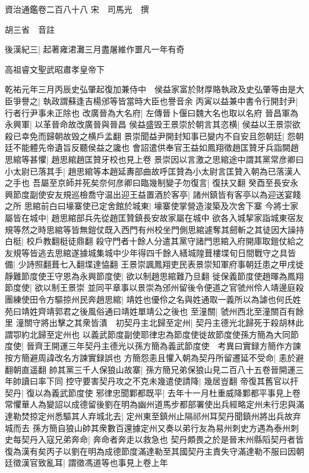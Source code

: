 資治通鑑卷二百八十八
宋　司馬光　撰

胡三省　音註

後漢紀三|{
	起著雍涒灘三月盡屠維作噩凡一年有奇}


高祖睿文聖武昭肅孝皇帝下

乾祐元年三月丙辰史弘肇起復加兼侍中　侯益家富於財厚賂執政及史弘肇等由是大臣爭譽之|{
	執政謂蘇逢吉楊邠等皆當時大臣也譽音余}
丙寅以益兼中書令行開封尹|{
	行者行尹事未正除也}
改廣晉為大名府|{
	左傳晉卜偃曰魏大名也取以名府}
晉昌軍為永興軍|{
	以革晉命故改廣晉與晉昌}
侯益盛毁王景崇於朝言其恣横|{
	侯益以王景崇欲殺已幸免而歸朝故毁之横戶孟翻}
景崇聞益尹開封知事已變内不自安且怨朝廷|{
	怨朝廷不能體先帝遺旨反聽侯益之讒也}
會詔遣供奉官王益如鳳翔徵趙匡贊牙兵詣闕趙思綰等甚懼|{
	趙思綰趙匡贊牙校也見上卷}
景崇因以言激之思綰途中謂其黨常彦卿曰小太尉已落其手|{
	趙思綰等本趙延夀部曲故呼匡贊為小太尉言匡贊入朝為已落漢人之手也}
吾屬至京師并死矣奈何彦卿曰臨幾制變子勿復言|{
	復扶又翻}
癸酉至長安永興節度副使安友規巡檢喬守温出迎王益置酒於客亭|{
	諸州鎮皆有客亭以為迎送宴餞之所}
思綰前白曰壕寨使已定舍館於城東|{
	壕寨使掌營造浚築及次舍下寨}
今將士家屬皆在城中|{
	趙思綰部兵先從趙匡贊鎮長安故家屬在城中}
欲各入城挈家詣城東宿友規等然之時思綰等皆無鎧仗既入西門有州校坐門側思綰遽奪其劒斬之其徒因大譟持白梃|{
	校戶教翻梃徒鼎翻}
殺守門者十餘人分遣其黨守諸門思綰入府開庫取鎧仗給之友規等皆逃去思綰遂據城集城中少年得四千餘人繕城隍葺樓堞旬日間戰守之具皆備|{
	少詩照翻葺七入翻堞達恊翻}
王景崇諷鳳翔吏民表景崇知軍府事朝廷患之甲戌徙靜難節度使王守恩為永興節度使|{
	欲以制趙思綰難乃旦翻}
徙保義節度使趙暉為鳳翔節度使|{
	欲以制王景崇}
並同平章事以景崇為邠州留後令便道之官虢州伶人靖邊庭殺團練使田令方驅掠州民奔趙思綰|{
	靖姓也優伶之名與姓通取一義所以為謔也何氏姓苑曰靖姓齊靖郭君之後風俗通曰靖姓單靖公之後也}
至潼關|{
	虢州西北至潼關百有餘里}
潼關守將出擊之其衆皆潰　初契丹主北歸至定州|{
	契丹主德光北歸死于殺胡林此謂卾約北歸至定州也}
以義武節度副使耶律忠為節度使徙故節度使孫方簡為大同節度使|{
	晉齊王開運三年契丹主德光以孫方簡為義武節度使　考異曰實録方簡作方諫按方簡避周諱改名方諫實録誤也}
方簡怨恚且懼入朝為契丹所留遷延不受命|{
	恚於避翻朝直遥翻}
帥其黨三千人保狼山故寨|{
	孫方簡兄弟保狼山見二百八十五卷晉開運三年帥讀曰率下同}
控守要害契丹攻之不克未幾遣使請降|{
	幾居豈翻}
帝復其舊官以扞契丹|{
	復以為義武節度使}
邪律忠聞鄴都既平|{
	去年十一月杜重威降鄴都平事見上卷}
常懼華人為變詔以成德留後劉在明為幽州道馬步都部署使出兵經略定州未行忠與滿達勒焚掠定州悉驅其人弃城北去|{
	定州東至鎮州止隔祁州耳契丹聞鎮州將出兵故弃城而去}
孫方簡自狼山帥其衆數百還據定州又奏以弟行友為易州刺史方遇為泰州刺史每契丹入寇兄弟奔命|{
	奔命者奔走以救急也}
契丹頗畏之於是晉末州縣䧟契丹者皆復為漢有矣丙子以劉在明為成德節度滿達勒至其國契丹主責失守滿達勒不服曰因朝廷徵漢官致亂耳|{
	謂徵馮道等也事見上卷上年}
